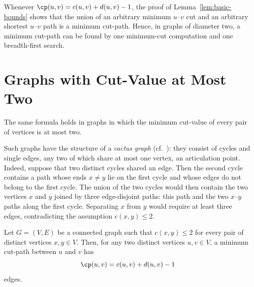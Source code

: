 \begin{remark}
\label{rem:algorithm}
Whenever $\cp(u, v) = c(u, v) + d(u, v) - 1$, the proof of Lemma~\ref{lem:basic-bounds} shows that the union of an arbitrary minimum $u$--$v$ cut and an arbitrary shortest $u$--$v$ path is a minimum cut-path.
Hence, in graphs of diameter two, a minimum cut-path can be found by one minimum-cut computation and one breadth-first search.
\end{remark}

\section{Graphs with Cut-Value at Most Two}
\label{sec:cut-two}

The same formula holds in graphs in which the minimum cut-value of every pair of vertices is at most two.

Such graphs have the structure of a \emph{cactus graph} (cf.~\cite{Mehlhorn2017Certifying}): they consist of cycles and single edges, any two of which share at most one vertex, an articulation point.
Indeed, suppose that two distinct cycles shared an edge.
Then the second cycle contains a path whose ends $x \neq y$ lie on the first cycle and whose edges do not belong to the first cycle.
The union of the two cycles would then contain the two vertices $x$ and $y$ joined by three edge-disjoint paths: this path and the two $x$--$y$ paths along the first cycle.
Separating $x$ from $y$ would require at least three edges, contradicting the assumption $c(x,y) \leq 2$.

\begin{theorem}
\label{thm:cut-two}
Let $G = (V, E)$ be a connected graph such that $c(x, y) \leq 2$ for every pair of distinct vertices $x, y \in V$.
Then, for any two distinct vertices $u,v \in V$, a minimum cut-path between $u$ and $v$ has
\[
\cp(u, v) = c(u, v) + d(u, v) - 1
\]
edges.
\end{theorem}

